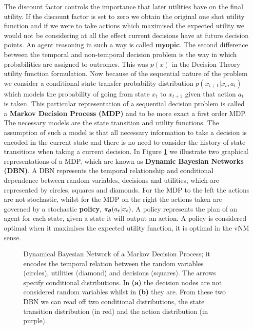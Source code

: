 The discount factor controls the importance that later utilities have on the final utility. If the discount factor is set to
zero we obtain the original one shot utility function and if we were to take actions which maximised the expected utility 
we would not be considering at all the effect current decisions have at future decision points. An agent reasoning in such a way is 
called \textbf{myopic}.
The second difference between the temporal and non-temporal decision problem is the way in which probabilities are assigned to 
outcomes. This was $p(x)$ in the Decision Theory utility function formulation.
Now because of the sequential nature of the problem we consider a conditional state transfer probability distribution $p(x_{t+1}|x_t,a_t)$
which models the probability of going from state $x_t$ to $x_{t+1}$ given that action $a_t$ is taken. This particular representation of a
sequential decision problem is called a \textbf{Markov Decision Process (MDP)} and to be more exact a first order MDP.
The necessary models are the state transition and utility functions. The assumption of such a model is that all necessary information to 
take a decision is encoded in the current state and there is no need to consider the history of state transitions when taking a current decision.
In Figure \ref{fig:mdp} we illustrate two graphical representations of a MDP, which are known as \textbf{Dynamic Bayesian Networks (DBN)}.
A DBN represents the temporal relationship and conditional dependence between random variables, decisions and utilities, which are 
represented by circles, squares and diamonds. For the MDP to the left the actions are not stochastic, whilst for the MDP on the right 
the actions taken are governed by a stochastic \textbf{policy}, $\operatorname{\pi_{\boldsymbol{\theta}}}(a_t|x_t)$. A policy represents the plan of an agent for each state,
given a state it will output an action. A policy is considered optimal when it maximises the expected utility function, it is optimal in the vNM sense.

\begin{figure}[h]
  \centering
  \caption{Dynamical Bayesian Network of a Markov Decision Process; it encodes the temporal relation between the random variables (circles),
  utilities (diamond) and decisions (squares). The arrows specify conditional distributions. In \textbf{(a)} the decision nodes are not considered 
  random variables whilst in \textbf{(b)} they are. From these two DBN  we can read off two conditional distributions, the state transition distribution (in red) and the action distribution (in purple). }
    \label{fig:mdp}
\end{figure}


